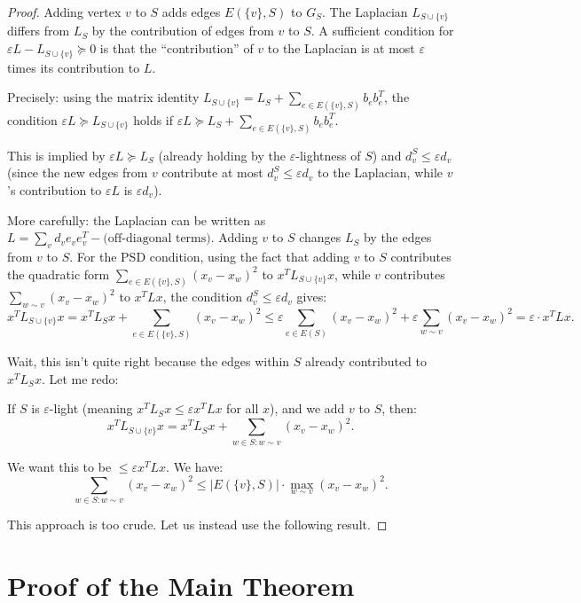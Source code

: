 \documentclass[12pt]{article}
\begin{document}
\begin{proof}
Adding vertex $v$ to $S$ adds edges $E(\{v\}, S)$ to $G_S$. The Laplacian $L_{S \cup \{v\}}$ differs from $L_S$ by the contribution of edges from $v$ to $S$. A sufficient condition for $\varepsilon L - L_{S\cup\{v\}} \succeq 0$ is that the ``contribution'' of $v$ to the Laplacian is at most $\varepsilon$ times its contribution to $L$.

Precisely: using the matrix identity $L_{S\cup\{v\}} = L_S + \sum_{e \in E(\{v\},S)} b_e b_e^T$, the condition $\varepsilon L \succeq L_{S\cup\{v\}}$ holds if $\varepsilon L \succeq L_S + \sum_{e \in E(\{v\},S)} b_e b_e^T$.

This is implied by $\varepsilon L \succeq L_S$ (already holding by the $\varepsilon$-lightness of $S$) and $d_v^S \leq \varepsilon d_v$ (since the new edges from $v$ contribute at most $d_v^S \leq \varepsilon d_v$ to the Laplacian, while $v$'s contribution to $\varepsilon L$ is $\varepsilon d_v$).

More carefully: the Laplacian can be written as $L = \sum_{v} d_v e_v e_v^T - \text{(off-diagonal terms)}$. Adding $v$ to $S$ changes $L_S$ by the edges from $v$ to $S$. For the PSD condition, using the fact that adding $v$ to $S$ contributes the quadratic form $\sum_{e \in E(\{v\},S)} (x_v - x_w)^2$ to $x^T L_{S\cup\{v\}} x$, while $v$ contributes $\sum_{w \sim v} (x_v - x_w)^2$ to $x^T L x$, the condition $d_v^S \leq \varepsilon d_v$ gives:
\[
x^T L_{S\cup\{v\}} x = x^T L_S x + \sum_{e \in E(\{v\},S)} (x_v - x_w)^2 \leq \varepsilon \sum_{e \in E(S)} (x_v-x_w)^2 + \varepsilon \sum_{w \sim v} (x_v-x_w)^2 = \varepsilon \cdot x^T L x.
\]

Wait, this isn't quite right because the edges within $S$ already contributed to $x^T L_S x$. Let me redo:

If $S$ is $\varepsilon$-light (meaning $x^T L_S x \leq \varepsilon x^T L x$ for all $x$), and we add $v$ to $S$, then:
\[
x^T L_{S\cup\{v\}} x = x^T L_S x + \sum_{w \in S: w \sim v} (x_v - x_w)^2.
\]

We want this to be $\leq \varepsilon x^T L x$. We have:
\[
\sum_{w \in S: w \sim v} (x_v - x_w)^2 \leq |E(\{v\}, S)| \cdot \max_{w \sim v}(x_v - x_w)^2.
\]

This approach is too crude. Let us instead use the following result.
\end{proof}

\section{Proof of the Main Theorem}
\end{document}

